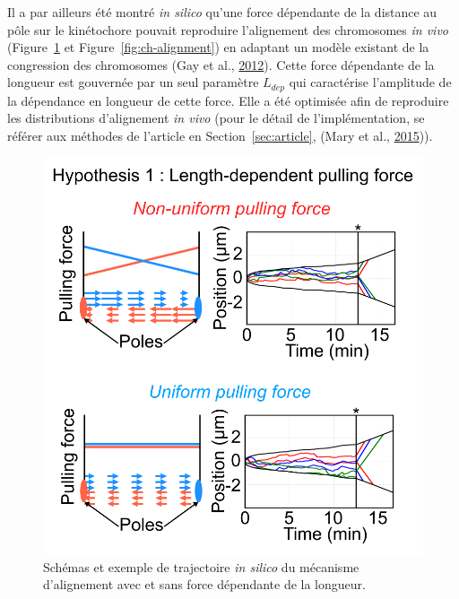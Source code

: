 \documentclass[12pt,a4paper,twoside,openright]{book}
\begin{document}
Il a par ailleurs été montré \emph{in silico} qu'une force dépendante de
la distance au pôle sur le kinétochore pouvait reproduire l'alignement
des chromosomes \emph{in vivo} (Figure~\ref{fig:hyp1} et
Figure~\ref{fig:ch-alignment}) en adaptant un modèle existant de la
congression des chromosomes (Gay et al., \hyperref[ref-Gay2012a]{2012}).
Cette force dépendante de la longueur est gouvernée par un seul
paramètre \(L_{dep}\) qui caractérise l'amplitude de la dépendance en
longueur de cette force. Elle a été optimisée afin de reproduire les
distributions d'alignement \emph{in vivo} (pour le détail de
l'implémentation, se référer aux méthodes de l'article en
Section~\ref{sec:article}, (Mary et al.,
\hyperref[ref-Mary2015]{2015})).

\begin{figure}[htbp]
\centering
\includegraphics{figures/results/modelling/hyp1.png}
\caption[Premier mécanisme expliquant l'alignement des chromosomes]{\label{fig:hyp1}Schémas
et exemple de trajectoire \emph{in silico} du mécanisme d'alignement
avec et sans force dépendante de la longueur.}
\end{figure}
\end{document}
